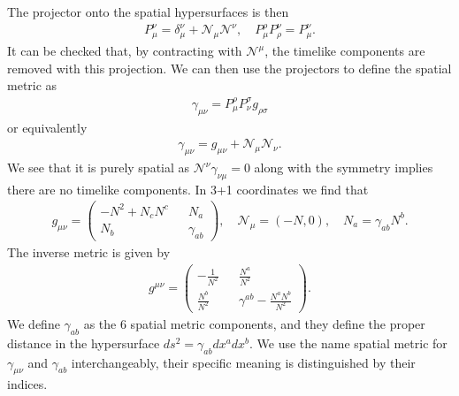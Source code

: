 \documentclass[10pt]{report}
\theoremstyle{definition}
\newcommand{\N}[0]{\mathcal{N}}
\begin{document}
The projector onto the spatial hypersurfaces is then 
\begin{align}
    P_\mu^\nu = \delta_\mu^\nu + \N_\mu \N^\nu, \quad P_\mu^\rho P_\rho^\nu = P_\mu^\nu.
\end{align}
It can be checked that, by contracting with $\N^\mu$, the timelike components are removed with this projection. We can then use the projectors to define the spatial metric as
\begin{align}
    \gamma_{\mu\nu} = P_\mu^\rho P_\nu^\sigma g_{\rho\sigma}
\end{align}
or equivalently 
\begin{align}
    \gamma_{\mu\nu} = g_{\mu\nu} + \N_\mu \N_\nu.
\end{align}
We see that it is purely spatial as $\N^\nu \gamma_{\nu\mu} = 0$ along with the symmetry implies there are no timelike components. In 3+1 coordinates we find that 
\begin{align}
    g_{\mu\nu} = \begin{pmatrix}
        -N^2 + N_c N^c && N_a \\ N_b && \gamma_{ab}
    \end{pmatrix}, \quad \N_\mu = (-N,0), \quad N_a = \gamma_{ab} N^b.
\end{align}
The inverse metric is given by 
\begin{align}
    g^{\mu\nu} = \begin{pmatrix}
        -\frac{1}{N^2} && \frac{N^a}{N^2} \\ \frac{N^b}{N^2} && \gamma^{ab} - \frac{N^a N^b}{N^2}
    \end{pmatrix}.
\end{align}
We define $\gamma_{ab}$ as the $6$ spatial metric components, and they define the proper distance in the hypersurface $ds^2 = \gamma_{ab} dx^a dx^b$. We use the name spatial metric for $\gamma_{\mu\nu}$ and $\gamma_{ab}$ interchangeably, their specific meaning is distinguished by their indices. 
\end{document}
